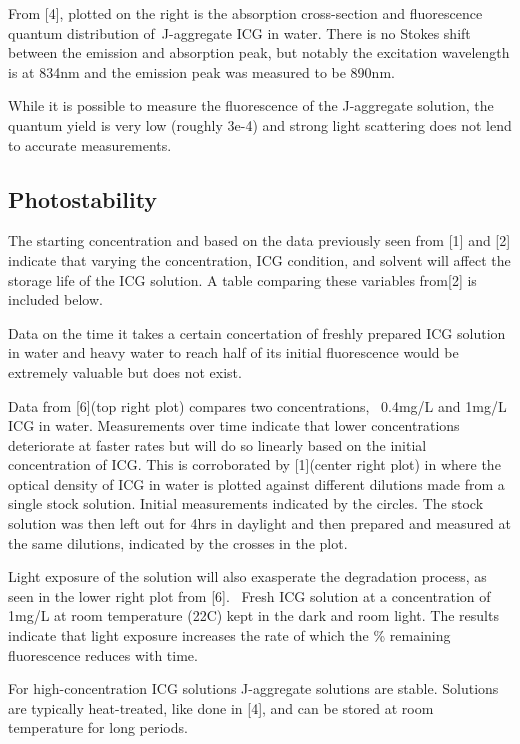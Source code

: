 From [4], plotted on the right is the absorption cross-section and fluorescence quantum distribution of J-aggregate ICG in water. There is no Stokes shift between the emission and absorption peak, but notably the excitation wavelength is at 834nm and the emission peak was measured to be 890nm. 

While it is possible to measure the fluorescence of the J-aggregate solution, the quantum yield is very low (roughly 3e-4) and strong light scattering does not lend to accurate measurements.

\subsection{ Photostability}
The starting concentration and based on the data previously seen from [1] and [2] indicate that varying the concentration, ICG condition, and solvent will affect the storage life of the ICG solution. A table comparing these variables from[2] is included below. 

Data on the time it takes a certain concertation of freshly prepared ICG solution in water and heavy water to reach half of its initial fluorescence would be extremely valuable but does not exist.

Data from [6](top right plot) compares two concentrations,  0.4mg/L and 1mg/L ICG in water. Measurements over time indicate that lower concentrations deteriorate at faster rates but will do so linearly based on the initial concentration of ICG. This is corroborated by [1](center right plot) in where the optical density of ICG in water is plotted against different dilutions made from a single stock solution. Initial measurements indicated by the circles. The stock solution was then left out for 4hrs in daylight and then prepared and measured at the same dilutions, indicated by the crosses in the plot. 

Light exposure of the solution will also exasperate the degradation process, as seen in the lower right plot from [6].  Fresh ICG solution at a concentration of 1mg/L at room temperature (22C) kept in the dark and room light. The results indicate that light exposure increases the rate of which the \% remaining fluorescence reduces with time. 

For high-concentration ICG solutions J-aggregate solutions are stable. Solutions are typically heat-treated, like done in [4], and can be stored at room temperature for long periods. 


